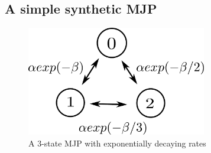 
\subsection{A simple synthetic MJP}
  \begin{figure}[H]
  \centering
  \begin{minipage}[!hp]{0.45\linewidth}
  \centering
    \includegraphics [width=0.70\textwidth, angle=0]{figs/exp_model.pdf}
      \end{minipage}
    \caption{A 3-state MJP with exponentially decaying rates}
    \label{fig:exp_model}
  \end{figure}

